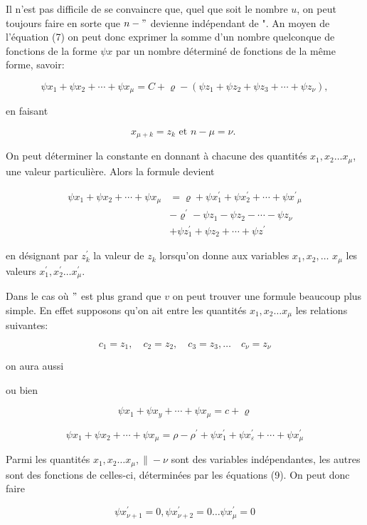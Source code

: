 \documentclass{article}
\begin{document}
Il n'est pas difficile de se convaincre que, quel que soit le nombre \(u\), on peut toujours faire en sorte que \(n-"\) devienne indépendant de ". An moyen de l'équation (7) on peut donc exprimer la somme d'un nombre quelconque de fonctions de la forme \(\psi x\) par un nombre déterminé de fonctions de la même forme, savoir:

\[
\psi x_{1}+\psi x_{2}+\cdots+\psi x_{\mu}=C+\varrho-\left(\psi z_{1}+\psi z_{2}+\psi z_{3}+\cdots+\psi z_{\nu}\right),
\]

en faisant

\[
x_{\mu+k}=z_{k} \text { et } n-\mu=\nu \text {. }
\]

On peut déterminer la constante en donnant à chacune des quantités \(x_{1}, x_{2} \ldots x_{\mu}\), une valeur particulière. Alors la formule devient

\[
\begin{aligned}
\psi x_{1}+\psi x_{2}+\cdots+\psi x_{\mu} & =\varrho+\psi x_{1}^{\prime}+\psi x_{2}^{\prime}+\cdots+\psi x^{\prime}{ }_{\mu} \\
& -\varrho^{\prime}-\psi z_{1}-\psi z_{2}-\cdots-\psi z_{\nu} \\
& +\psi z_{1}^{\prime}+\psi z_{2}+\cdots+\psi z^{\prime}
\end{aligned}
\]

en désignant par \(z_{k}^{\prime}\) la valeur de \(z_{k}\) lorsqu'on donne aux variables \(x_{1}, x_{2}, \ldots\) \(x_{\mu}\) les valeurs \(x_{1}^{\prime}, x_{2}^{\prime} \ldots x_{\mu}^{\prime}\).

Dans le cas où \("\) est plus grand que \(v\) on peut trouver une formule beaucoup plus simple. En effet supposons qu'on ait entre les quantités \(x_{1}, x_{2} \ldots x_{\mu}\) les relations suivantes:

\[
c_{1}=z_{1}, \quad c_{2}=z_{2}, \quad c_{3}=z_{3}, \ldots \quad c_{\nu}=z_{\nu}
\]

on aura aussi

ou bien

\[
\psi x_{1}+\psi x_{y}+\cdots+\psi x_{\mu}=c+\varrho
\]

\[
\psi x_{1}+\psi x_{2}+\cdots+\psi x_{\mu}=\rho-\rho^{\prime}+\psi x_{1}^{\prime}+\psi x_{\varepsilon}^{\prime}+\cdots+\psi x_{\mu}^{\prime}
\]

Parmi les quantités \(x_{1}, x_{2} \ldots x_{\mu}, \|-\nu\) sont des variables indépendantes, les autres sont des fonctions de celles-ci, déterminées par les équations (9). On peut donc faire

\[
\psi x_{\nu+1}^{\prime}=0, \psi x_{\nu+2}^{\prime}=0 \ldots \psi x_{\mu}^{\prime}=0
\]
\end{document}
